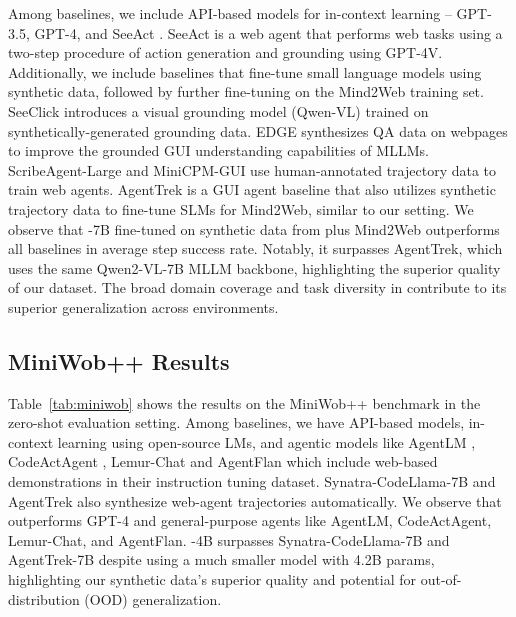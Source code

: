 Among baselines, we include API-based models for in-context learning -- GPT-3.5, GPT-4, and SeeAct \cite{zheng2024gpt}. 
SeeAct is a web agent that performs web tasks using a two-step procedure of action generation and grounding using GPT-4V.
Additionally, we include baselines that fine-tune small language models using synthetic data, followed by further fine-tuning on the Mind2Web training set.
SeeClick \cite{seeclick} introduces a visual grounding model (Qwen-VL) trained on synthetically-generated grounding data.
EDGE \cite{chen2024edge} synthesizes QA data on webpages to improve the grounded GUI understanding capabilities of MLLMs.
ScribeAgent-Large \cite{shen2024scribeagent} and MiniCPM-GUI \cite{chen2024guicourse} use human-annotated trajectory data to train web agents.
AgentTrek \cite{xu2024agenttrek} is a GUI agent baseline that also utilizes synthetic trajectory data to fine-tune SLMs for Mind2Web, similar to our setting.
We observe that \model-7B fine-tuned on synthetic data from \model plus Mind2Web outperforms all baselines in average step success rate.
Notably, it surpasses AgentTrek, which uses the same Qwen2-VL-7B MLLM backbone, highlighting the superior quality of our dataset.
The broad domain coverage and task diversity in \model contribute to its superior generalization across environments.



\subsection{MiniWob++ Results}
Table~\ref{tab:miniwob} shows the results on the MiniWob++ benchmark in the zero-shot evaluation setting.
Among baselines, we have API-based models, in-context learning using open-source LMs, and agentic models like AgentLM \cite{DBLP:conf/acl/ZengLLWLD024}, CodeActAgent \cite{DBLP:conf/icml/WangCY0L0J24}, Lemur-Chat \cite{DBLP:conf/iclr/XuSXMLSHZLXCZKW24} and AgentFlan \cite{DBLP:conf/acl/ChenLWZLLCZ24} which include web-based demonstrations in their instruction tuning dataset.
Synatra-CodeLlama-7B \cite{Ou2024SynatraTI} and AgentTrek \cite{xu2024agenttrek} also synthesize web-agent trajectories automatically.
We observe that \model outperforms GPT-4 and general-purpose agents like AgentLM, CodeActAgent, Lemur-Chat, and AgentFlan.
\model-4B surpasses Synatra-CodeLlama-7B and AgentTrek-7B despite using a much smaller model with 4.2B params, highlighting our synthetic data's superior quality and potential for out-of-distribution (OOD) generalization.


